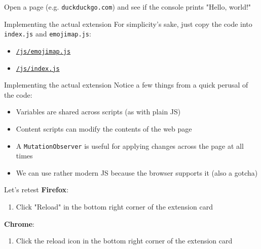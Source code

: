 \documentclass[../index.tex]{subfiles}
\begin{document}
\begin{frame}[fragile]{\currenttitle}
  Open a page (e.g. \texttt{duckduckgo.com}) and see if the console prints
  "Hello, world!"
\end{frame}

\renewcommand{\currenttitle}{Implementing the actual extension}
\begin{frame}[fragile]{\currenttitle}
  For simplicity's sake, just copy the code into \texttt{index.js} and
  \texttt{emojimap.js}:

  \begin{itemize}
    \item \href{https://github.com/Dophin2009/webext101/blob/master/emojisub/js/emojimap.js}{\texttt{/js/emojimap.js}}
    \item \href{https://github.com/Dophin2009/webext101/blob/master/emojisub/js/index.js}{\texttt{/js/index.js}}
  \end{itemize}
\end{frame}

\begin{frame}[fragile]{\currenttitle}
  Notice a few things from a quick perusal of the code:

  \begin{itemize}
    \item Variables are shared across scripts (as with plain JS)
    \item Content scripts can modify the contents of the web page
    \item A \texttt{MutationObserver} is useful for applying changes across the
          page at all times
    \item We can use rather modern JS because the browser supports it (also a
          gotcha)
  \end{itemize}
\end{frame}

\renewcommand{\currenttitle}{Let's retest}
\begin{frame}{\currenttitle}
  \textbf{Firefox}:
  \begin{enumerate}
    \item Click "Reload" in the bottom right corner of the extension card
  \end{enumerate}

  \textbf{Chrome}:
  \begin{enumerate}
    \item Click the reload icon in the bottom right corner of the extension
          card
  \end{enumerate}
\end{frame}

\end{document}
